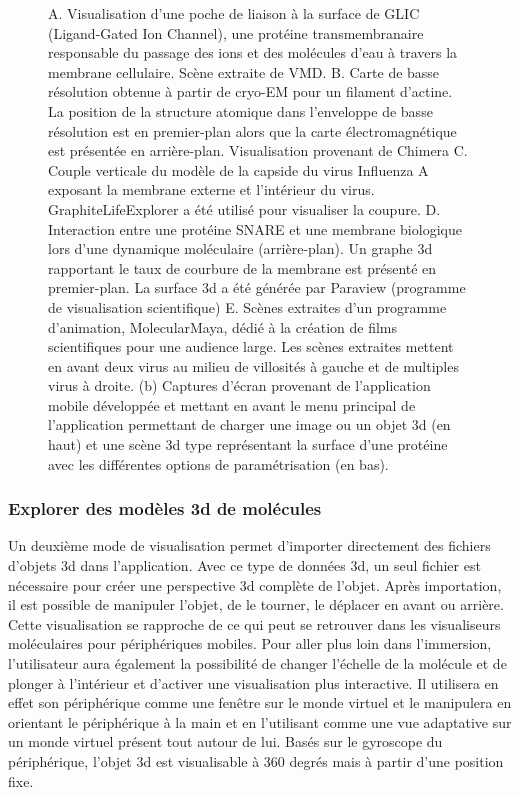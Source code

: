 \begin{figure}[h]
{{A. Visualisation d'une poche de liaison à la surface de GLIC (Ligand-Gated Ion Channel), une protéine transmembranaire responsable du passage des ions et des molécules d'eau à travers la membrane cellulaire. Scène extraite de VMD. B. Carte de basse résolution obtenue à partir de cryo-EM pour un filament d'actine. La position de la structure atomique dans l'enveloppe de basse résolution est en premier-plan alors que la carte électromagnétique est présentée en arrière-plan. Visualisation provenant de Chimera C. Couple verticale du modèle de la capside du virus Influenza A exposant la membrane externe et l'intérieur du virus. GraphiteLifeExplorer a été utilisé pour visualiser la coupure. D. Interaction entre une protéine SNARE et une membrane biologique lors d'une dynamique moléculaire (arrière-plan). Un graphe 3d rapportant le taux de courbure de la membrane est présenté en premier-plan. La surface 3d a été générée par Paraview (programme de visualisation scientifique) E. Scènes extraites d'un programme d'animation, MolecularMaya, dédié à la création de films scientifiques pour une audience large. Les scènes extraites mettent en avant deux virus au milieu de villosités à gauche et de multiples virus à droite.
(b) Captures d'écran provenant de l'application mobile développée et mettant en avant le menu principal de l'application permettant de charger une image ou un objet 3d (en haut) et une scène 3d type représentant la surface d'une protéine avec les différentes options de paramétrisation (en bas).}}
\end{figure}

\subsubsection{Explorer des modèles 3d de molécules}

Un deuxième mode de visualisation permet d'importer directement des fichiers d'objets 3d dans l'application. Avec ce type de données 3d, un seul fichier est nécessaire pour créer une perspective 3d complète de l'objet. Après importation, il est possible de manipuler l'objet, de le tourner, le déplacer en avant ou arrière. Cette visualisation se rapproche de ce qui peut se retrouver dans les visualiseurs moléculaires pour périphériques mobiles.
Pour aller plus loin dans l'immersion, l'utilisateur aura également la possibilité de changer l'échelle de la molécule et de plonger à l'intérieur et d'activer une visualisation plus interactive.
Il utilisera en effet son périphérique comme une fenêtre sur le monde virtuel et le manipulera en orientant le périphérique à la main et en l'utilisant comme une vue adaptative sur un monde virtuel présent tout autour de lui. Basés sur le gyroscope du périphérique, l'objet 3d est visualisable à 360 degrés mais à partir d'une position fixe. 

